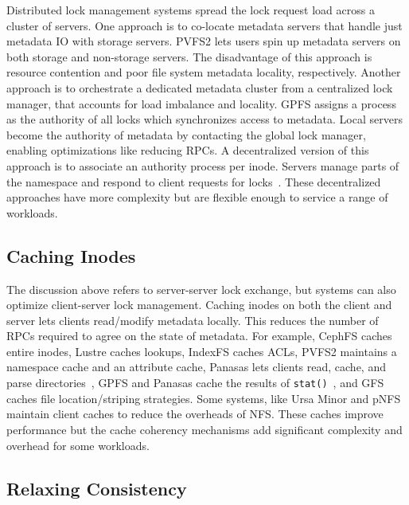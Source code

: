 Distributed lock management systems spread the lock request load across a
cluster of servers. One approach is to co-locate metadata servers that handle
just metadata IO with storage servers. PVFS2 lets users spin up metadata
servers on both storage and non-storage servers. The disadvantage of this
approach is resource contention and poor file system metadata locality,
respectively. Another approach is to orchestrate a dedicated metadata cluster
from a centralized lock manager, that accounts for load imbalance and locality.
GPFS assigns a process as the authority of all locks which synchronizes access
to metadata. Local servers become the authority of metadata by contacting the
global lock manager, enabling optimizations like reducing RPCs. A decentralized
version of this approach is to associate an authority process per inode.
Servers manage parts of the namespace and respond to client requests for
locks~\cite{wang:tech09-lustre, ren:sc2014-indexfs, weil:sc2004-dyn-metadata,
welch:fast08-panasas}.  These decentralized approaches have more complexity but
are flexible enough to service a range of workloads.

\subsection{Caching Inodes}

The discussion above refers to server-server lock exchange, but systems can
also optimize client-server lock management. Caching inodes on both the client
and server lets clients read/modify metadata locally.  This reduces the number
of RPCs required to agree on the state of metadata.  For example, CephFS caches
entire inodes, Lustre caches lookups, IndexFS caches ACLs, PVFS2 maintains a
namespace cache and an attribute cache, Panasas lets clients read, cache, and
parse directories~\cite{welch:fast08-panasas}, GPFS and Panasas cache the
results of \texttt{stat()}~\cite{docs:cephcaps, schmuck:fast2002-gpfs,
wang:tech09-lustre, depardon:tech13-survey}, and GFS caches file
location/striping strategies.  Some systems, like Ursa Minor and pNFS maintain
client caches to reduce the overheads of NFS. These caches improve performance
but the cache coherency mechanisms add significant complexity and overhead for
some workloads.

\subsection{Relaxing Consistency}


